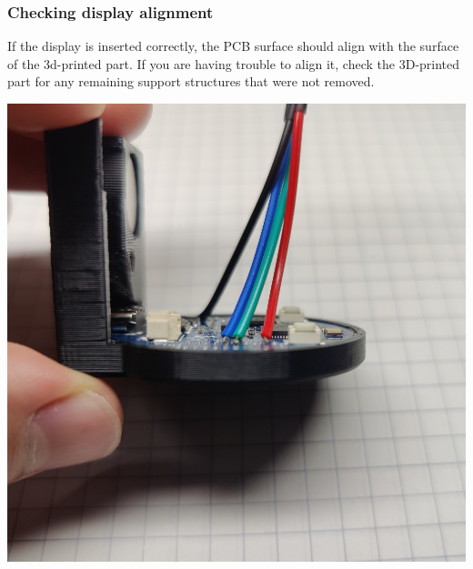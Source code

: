 \documentclass[]{article}
\begin{document}
\subsubsection{Checking display alignment}
\begin{minipage}[t]{0.5\linewidth}
	\vspace{0pt}
	If the display is inserted correctly, the PCB surface should align with the surface of the 3d-printed part. If you are having trouble to align it, check the 3D-printed part for any remaining support structures that were not removed.
\end{minipage}
\hfill
\begin{minipage}[t]{0.4\linewidth}
	\vspace{0pt}
	\includegraphics[width=\linewidth]{images/01_displayunit/14_check_display1.jpg}
\end{minipage}
\end{document}
